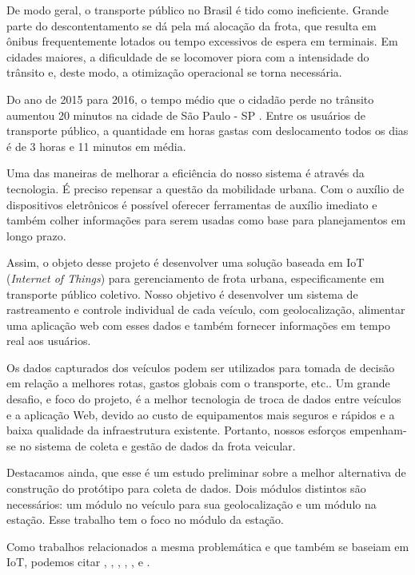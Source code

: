 \documentclass[12pt]{uftpibicsic2018}
\begin{document}
De modo geral, o transporte público no Brasil é tido como ineficiente. Grande parte do descontentamento se dá pela má alocação da frota, que resulta em ônibus frequentemente lotados ou tempo excessivos de espera em terminais. Em cidades maiores, a dificuldade de se locomover piora com a intensidade do trânsito e, deste modo, a otimização operacional se torna necessária.

Do ano de 2015 para 2016, o tempo médio que o cidadão perde no trânsito aumentou 20 minutos na cidade de São Paulo - SP \cite{veja_tempo_sp}. Entre os usuários de transporte público, a quantidade em horas gastas com deslocamento todos os dias é de 3 horas e 11 minutos em média.

Uma das maneiras de melhorar a eficiência do nosso sistema é através da tecnologia. É preciso repensar a questão da mobilidade urbana. Com o auxílio de dispositivos eletrônicos é possível oferecer ferramentas de auxílio imediato e também colher informações para serem usadas como base para planejamentos em longo prazo.

Assim, o objeto desse projeto é desenvolver uma solução baseada em IoT ({\it Internet of Things}) para gerenciamento de frota urbana, especificamente em transporte público coletivo. Nosso objetivo é desenvolver um sistema de rastreamento e controle individual de cada veículo, com geolocalização, alimentar uma aplicação web com esses dados e também fornecer informações em tempo real aos usuários. 

Os dados capturados dos veículos podem ser utilizados para tomada de decisão em relação a melhores rotas, gastos globais com o transporte, etc.. Um grande desafio, e foco do projeto, é a melhor tecnologia de troca de dados entre veículos e a aplicação Web, devido ao custo de equipamentos mais seguros e rápidos e a baixa qualidade da infraestrutura existente. Portanto, nossos esforços empenham-se no sistema de coleta e gestão de dados da frota veicular.

Destacamos ainda, que esse é um estudo preliminar sobre a melhor alternativa de construção do protótipo para coleta de dados. Dois módulos distintos são necessários: um módulo no veículo para sua geolocalização e um módulo na estação. Esse trabalho tem o foco no módulo da estação.

Como trabalhos relacionados a mesma problemática e que também se baseiam em IoT, podemos citar \cite{Sharif2018}, \cite{Moore2016}, \cite{Ghazal2016}, \cite{Kodire2016}, \cite{Ibrahim2017}, \cite{Mohammed2017} e \cite{Ibraheem2018}.
\end{document}
